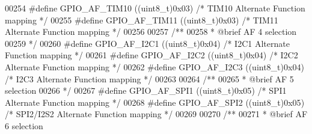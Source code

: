 \begin{DoxyCode}
00254 \textcolor{preprocessor}{#}\textcolor{preprocessor}{define} \textcolor{preprocessor}{GPIO\_AF\_TIM10}         \textcolor{preprocessor}{(}\textcolor{preprocessor}{(}\textcolor{preprocessor}{uint8\_t}\textcolor{preprocessor}{)}0x03\textcolor{preprocessor}{)}  \textcolor{comment}{/* TIM10 Alternate Function mapping */}
00255 \textcolor{preprocessor}{#}\textcolor{preprocessor}{define} \textcolor{preprocessor}{GPIO\_AF\_TIM11}         \textcolor{preprocessor}{(}\textcolor{preprocessor}{(}\textcolor{preprocessor}{uint8\_t}\textcolor{preprocessor}{)}0x03\textcolor{preprocessor}{)}  \textcolor{comment}{/* TIM11 Alternate Function mapping */}
00256 
00257 \textcolor{comment}{/** }
00258 \textcolor{comment}{  * @brief   AF 4 selection  }
00259 \textcolor{comment}{  */}
00260 \textcolor{preprocessor}{#}\textcolor{preprocessor}{define} \textcolor{preprocessor}{GPIO\_AF\_I2C1}          \textcolor{preprocessor}{(}\textcolor{preprocessor}{(}\textcolor{preprocessor}{uint8\_t}\textcolor{preprocessor}{)}0x04\textcolor{preprocessor}{)}  \textcolor{comment}{/* I2C1 Alternate Function mapping */}
00261 \textcolor{preprocessor}{#}\textcolor{preprocessor}{define} \textcolor{preprocessor}{GPIO\_AF\_I2C2}          \textcolor{preprocessor}{(}\textcolor{preprocessor}{(}\textcolor{preprocessor}{uint8\_t}\textcolor{preprocessor}{)}0x04\textcolor{preprocessor}{)}  \textcolor{comment}{/* I2C2 Alternate Function mapping */}
00262 \textcolor{preprocessor}{#}\textcolor{preprocessor}{define} \textcolor{preprocessor}{GPIO\_AF\_I2C3}          \textcolor{preprocessor}{(}\textcolor{preprocessor}{(}\textcolor{preprocessor}{uint8\_t}\textcolor{preprocessor}{)}0x04\textcolor{preprocessor}{)}  \textcolor{comment}{/* I2C3 Alternate Function mapping */}
00263 
00264 \textcolor{comment}{/** }
00265 \textcolor{comment}{  * @brief   AF 5 selection  }
00266 \textcolor{comment}{  */}
00267 \textcolor{preprocessor}{#}\textcolor{preprocessor}{define} \textcolor{preprocessor}{GPIO\_AF\_SPI1}          \textcolor{preprocessor}{(}\textcolor{preprocessor}{(}\textcolor{preprocessor}{uint8\_t}\textcolor{preprocessor}{)}0x05\textcolor{preprocessor}{)}  \textcolor{comment}{/* SPI1 Alternate Function mapping */}
00268 \textcolor{preprocessor}{#}\textcolor{preprocessor}{define} \textcolor{preprocessor}{GPIO\_AF\_SPI2}          \textcolor{preprocessor}{(}\textcolor{preprocessor}{(}\textcolor{preprocessor}{uint8\_t}\textcolor{preprocessor}{)}0x05\textcolor{preprocessor}{)}  \textcolor{comment}{/* SPI2/I2S2 Alternate Function mapping */}
00269 
00270 \textcolor{comment}{/** }
00271 \textcolor{comment}{  * @brief   AF 6 selection  }

\end{DoxyCode}
